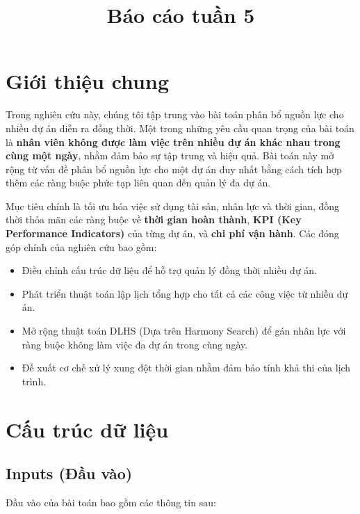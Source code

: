 \documentclass{article}
\title{Báo cáo tuần 5}
\author{}
\date{}
\begin{document}
\maketitle

\section{Giới thiệu chung}

Trong nghiên cứu này, chúng tôi tập trung vào bài toán phân bổ nguồn lực cho nhiều dự án diễn ra đồng thời. Một trong những yêu cầu quan trọng của bài toán là \textbf{nhân viên không được làm việc trên nhiều dự án khác nhau trong cùng một ngày}, nhằm đảm bảo sự tập trung và hiệu quả. Bài toán này mở rộng từ vấn đề phân bổ nguồn lực cho một dự án duy nhất bằng cách tích hợp thêm các ràng buộc phức tạp liên quan đến quản lý đa dự án.

Mục tiêu chính là tối ưu hóa việc sử dụng tài sản, nhân lực và thời gian, đồng thời thỏa mãn các ràng buộc về \textbf{thời gian hoàn thành}, \textbf{KPI (Key Performance Indicators)} của từng dự án, và \textbf{chi phí vận hành}. Các đóng góp chính của nghiên cứu bao gồm:
\begin{itemize}
    \item Điều chỉnh cấu trúc dữ liệu để hỗ trợ quản lý đồng thời nhiều dự án.
    \item Phát triển thuật toán lập lịch tổng hợp cho tất cả các công việc từ nhiều dự án.
    \item Mở rộng thuật toán DLHS (Dựa trên Harmony Search) để gán nhân lực với ràng buộc không làm việc đa dự án trong cùng ngày.
    \item Đề xuất cơ chế xử lý xung đột thời gian nhằm đảm bảo tính khả thi của lịch trình.
\end{itemize}

\section{Cấu trúc dữ liệu}
\subsection{Inputs (Đầu vào)}
    Đầu vào của bài toán bao gồm các thông tin sau: 
\end{document}
